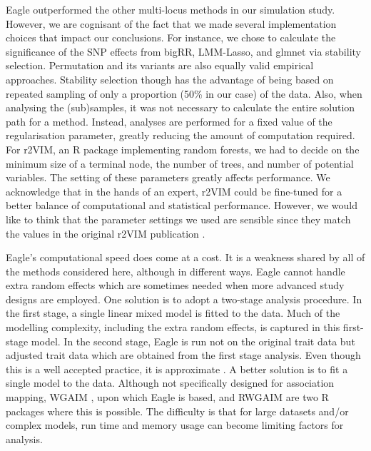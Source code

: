 \documentclass{bioinfo}
\begin{document}
Eagle outperformed the other multi-locus methods in our simulation study. However, we are cognisant of the fact  that we made several implementation 
choices that impact our conclusions.  For instance, we chose to calculate the significance of the 
SNP effects from bigRR, LMM-Lasso, and glmnet via stability selection.  Permutation and its variants \citep{ browning2008presto,pahl2010permory} are also equally valid empirical approaches. Stability selection though has the advantage of being based on repeated sampling of only a proportion (50\% in our case) of the 
data. Also, when analysing the (sub)samples, it was not necessary to calculate the entire solution path for a method. 
 Instead,  analyses are 
performed for a fixed value of the regularisation parameter, greatly reducing the amount of computation required. For r2VIM, an R package 
implementing random forests, we had to decide on the  minimum size of a terminal node, the number of trees, and number of potential variables. 
The setting of these parameters greatly affects performance.  We  acknowledge that in the hands of an expert, 
r2VIM could be fine-tuned for a better balance of computational and statistical performance. 
However, we would like to think that the parameter settings we used are sensible 
since they match the values in the original r2VIM publication \citep{szymczak2016r2vim}.



Eagle's computational speed does come at a cost. It is a weakness shared by all of the methods considered here, although in different ways. 
Eagle cannot handle extra random effects which are sometimes needed when more advanced study designs are employed. One solution 
is to adopt a two-stage analysis procedure. In the first stage, a single linear mixed model is fitted to the data. Much of the modelling complexity, 
including the extra random effects, is 
captured in this first-stage model. In the second stage, Eagle is run not on the original trait data but adjusted trait data which are obtained from the first stage analysis. Even though this is a well accepted practice, it is approximate \citep{gogel2018comparison}.  A better solution is to fit a single model to the data. 
Although not specifically designed for association mapping,
WGAIM \citep{verbyla2007analysis}, upon which Eagle is based, and RWGAIM \citep{verbyla2012rwgaim}  are two R packages where this is possible. The difficulty is that for large datasets and/or complex 
models,  run time and memory usage can become limiting factors for analysis. 
\end{document}
